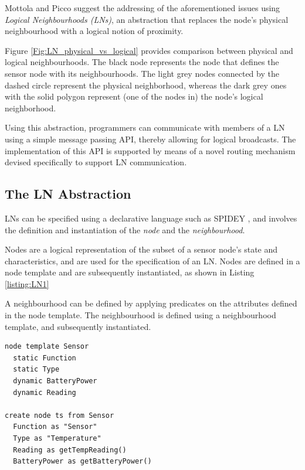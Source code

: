 Mottola and Picco \cite{mottola_LN:2006} suggest the addressing of the
aforementioned issues using \emph{Logical Neighbourhoods (LNs)}, an
abstraction that replaces the node's physical neighbourhood with a logical notion of
proximity. 

Figure \ref{Fig:LN_physical_vs_logical} provides comparison between
physical and logical neighbourhoods. The black node represents the node
that defines the sensor node with its neighbourhoods. The light grey nodes
connected by the dashed circle represent the physical neighborhood, whereas the
dark grey ones with the solid polygon represent (one of the nodes in) the
node's logical neighborhood.


Using this
abstraction, programmers can communicate with members of a LN using a simple message passing API,
thereby allowing for logical broadcasts. The implementation of this API is
supported by means of a novel routing mechanism devised specifically to support
LN communication. 

\subsection{The LN Abstraction}

LNs can be specified using a declarative language such as SPIDEY
\cite{mottola_LN:2006, mottola_LNScoping:2006}, and
involves the definition and instantiation of the \emph{node} and the
\emph{neighbourhood}. 

Nodes are a logical representation of the subset of a sensor node's state and
characteristics, and are used for the specification of an LN. Nodes are defined
in a node template and are subsequently instantiated, as shown in Listing \ref{listing:LN1}
   
A neighbourhood can be defined by applying predicates on the attributes defined
in the node template. The neighbourhood is defined using a neighbourhood
template, and subsequently instantiated.
   
\begin{lstlisting}[frame=trbl, basewidth={0.55em, 0.6em}, captionpos=b, 
basicstyle=\ttfamily\footnotesize, breaklines, caption = Node Definition and Instantiation, label = listing:LN1]  
node template Sensor
  static Function
  static Type
  dynamic BatteryPower
  dynamic Reading

create node ts from Sensor
  Function as "Sensor"
  Type as "Temperature"
  Reading as getTempReading()
  BatteryPower as getBatteryPower()
\end{lstlisting}


